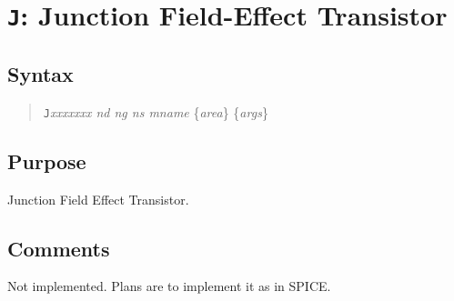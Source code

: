 %
%
%
%
\section{{\tt J}: Junction Field-Effect Transistor}
\subsection{Syntax}
\begin{verse}
{\tt J}{\it xxxxxxx nd ng ns mname} \{{\it area}\} \{{\it args}\}
\end{verse}
\subsection{Purpose}

Junction Field Effect Transistor.
\subsection{Comments}

Not implemented.
Plans are to implement it as in SPICE.
